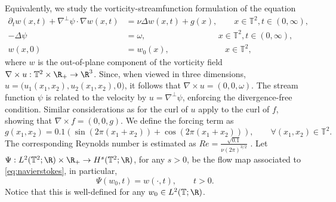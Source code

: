 Equivalently, we study the vorticity-streamfunction formulation of the equation
\begin{subequations}
\label{eq:navierstokes}
\begin{align}
\partial_t w(x,t) + \nabla^{\perp}\psi \cdot \nabla w(x,t) &= \nu \Delta w(x,t) + g(x), \qquad x \in \mathbb{T}^2, t \in (0,\infty),  \\
-\Delta \psi&=\omega, \qquad\qquad\qquad\qquad\:\:\: x \in \mathbb{T}^2, t \in (0,\infty),  \\
 w(x,0) &= w_0(x), \qquad \qquad \qquad \:\:\: x \in \mathbb{T}^2, 
\end{align}
\end{subequations}
where \(w\) is the out-of-plane component of the vorticity field \(\nabla \times u: \mathbb{T}^2 \times \R_+ \to \R^3\). Since, when viewed in three dimensions, 
$u=\bigl(u_1(x_1,x_2),u_2(x_1,x_2),0\bigr)$, it follows that
$\nabla \times u=(0,0,\omega).$ 
The stream function $\psi$ is related to the velocity by 
$u=\nabla^{\perp}\psi$, enforcing the divergence-free condition.
Similar considerations as for the curl of $u$ apply to the curl of $f$, 
showing that $\nabla \times f=(0,0,g).$
 We define the forcing term as
\[g(x_1,x_2) = 0.1(\sin(2\pi(x_1+x_2)) + \cos(2\pi(x_1 + x_2))), \qquad \forall (x_1,x_2) \in \mathbb{T}^2.\]
 The corresponding Reynolds number is estimated as 
 $Re = \frac{\sqrt{0.1}}{\nu (2 \pi)^{3/2}}$ \citep{chandler2013invariant}.
Let \(\Psi : L^2(\mathbb{T}^2;\R) \times \R_+ \to H^s(\mathbb{T}^2;\R)\), for any \(s > 0\), be the flow map associated to \eqref{eq:navierstokes}, in particular,
\[\Psi(w_0,t) = w(\cdot,t), \qquad t > 0.\]
Notice that this is well-defined for any \(w_0 \in L^2(\mathbb{T};\R)\). 

